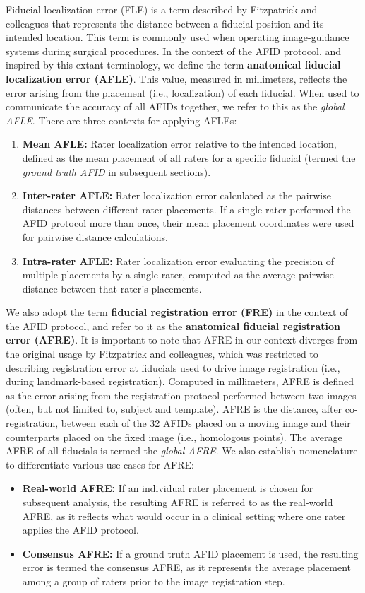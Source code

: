 \newpage
Fiducial localization error (FLE) is a term described by Fitzpatrick and colleagues\cite{Fitzpatrick1998-hp} that represents the distance between a fiducial position and its intended location. This term is commonly used when operating image-guidance systems during surgical procedures. In the context of the AFID protocol, and inspired by this extant terminology, we define the term \textbf{anatomical fiducial localization error (AFLE)}. This value, measured in millimeters, reflects the error arising from the placement (i.e., localization) of each fiducial. When used to communicate the accuracy of all AFIDs together, we refer to this as the \emph{global AFLE}. There are three contexts for applying AFLEs:
\begin{enumerate}
    \item \textbf{Mean AFLE:} Rater localization error relative to the intended location, defined as the mean placement of all raters for a specific fiducial (termed the \emph{ground truth AFID} in subsequent sections).
    \item \textbf{Inter-rater AFLE:} Rater localization error calculated as the pairwise distances between different rater placements. If a single rater performed the AFID protocol more than once, their mean placement coordinates were used for pairwise distance calculations.
    \item \textbf{Intra-rater AFLE:} Rater localization error evaluating the precision of multiple placements by a single rater, computed as the average pairwise distance between that rater’s placements.
\end{enumerate}

We also adopt the term \textbf{fiducial registration error (FRE)} in the context of the AFID protocol, and refer to it as the \textbf{anatomical fiducial registration error (AFRE)}. It is important to note that AFRE in our context diverges from the original usage by Fitzpatrick and colleagues\cite{Fitzpatrick1998-hp}, which was restricted to describing registration error at fiducials used to drive image registration (i.e., during landmark-based registration). Computed in millimeters, AFRE is defined as the error arising from the registration protocol performed between two images (often, but not limited to, subject and template). AFRE is the distance, after co-registration, between each of the 32 AFIDs placed on a moving image and their counterparts placed on the fixed image (i.e., homologous points). The average AFRE of all fiducials is termed the \emph{global AFRE}. We also establish nomenclature to differentiate various use cases for AFRE:
\begin{itemize}
    \item \textbf{Real-world AFRE:} If an individual rater placement is chosen for subsequent analysis, the resulting AFRE is referred to as the real-world AFRE, as it reflects what would occur in a clinical setting where one rater applies the AFID protocol.
    \item \textbf{Consensus AFRE:} If a ground truth AFID placement is used, the resulting error is termed the consensus AFRE, as it represents the average placement among a group of raters prior to the image registration step.
\end{itemize}

